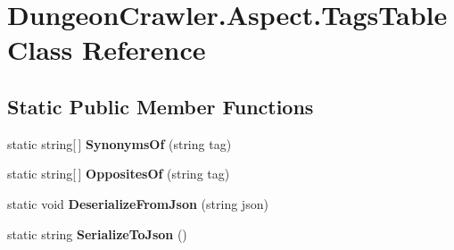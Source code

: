 \hypertarget{class_dungeon_crawler_1_1_aspect_1_1_tags_table}{}\section{Dungeon\+Crawler.\+Aspect.\+Tags\+Table Class Reference}
\label{class_dungeon_crawler_1_1_aspect_1_1_tags_table}
\subsection*{Static Public Member Functions}
\begin{DoxyCompactItemize}
\item 
\hypertarget{class_dungeon_crawler_1_1_aspect_1_1_tags_table_a0cdc08ba2ecd7b94fe523761ddc9cb80}{}static string\mbox{[}$\,$\mbox{]} {\bfseries Synonyms\+Of} (string tag)\label{class_dungeon_crawler_1_1_aspect_1_1_tags_table_a0cdc08ba2ecd7b94fe523761ddc9cb80}

\item 
\hypertarget{class_dungeon_crawler_1_1_aspect_1_1_tags_table_a74496fbfd047b45d721717230e2cfff6}{}static string\mbox{[}$\,$\mbox{]} {\bfseries Opposites\+Of} (string tag)\label{class_dungeon_crawler_1_1_aspect_1_1_tags_table_a74496fbfd047b45d721717230e2cfff6}

\item 
\hypertarget{class_dungeon_crawler_1_1_aspect_1_1_tags_table_a69290046f0866a58a2b8d2c4f277bd99}{}static void {\bfseries Deserialize\+From\+Json} (string json)\label{class_dungeon_crawler_1_1_aspect_1_1_tags_table_a69290046f0866a58a2b8d2c4f277bd99}

\item 
\hypertarget{class_dungeon_crawler_1_1_aspect_1_1_tags_table_abc387fe41f841525e23e79a0a459ac6d}{}static string {\bfseries Serialize\+To\+Json} ()\label{class_dungeon_crawler_1_1_aspect_1_1_tags_table_abc387fe41f841525e23e79a0a459ac6d}

\end{DoxyCompactItemize}
